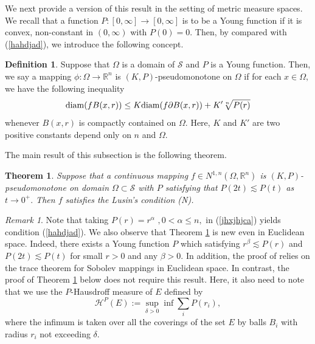 \documentclass[11pt,twoside]{article}
\newtheorem{thm}{Theorem}[section]
\theoremstyle{definition}
\newtheorem{defn}{Definition}[section]
\theoremstyle{remark}
\newtheorem*{rem}{Remark}
\newcommand{\aleq}{\lesssim}
\begin{document}
We next provide a version of this result in the setting of metric measure spaces. We recall that a function $P:[0,\infty]\rightarrow[0,\infty]$ is to be a Young function if it is convex, non-constant in $(0,\infty)$ with $P(0)=0.$ Then, by compared with (\ref{hahdjad}), we introduce the following concept.
\begin{defn}\label{019001sfgvbsdvfvg b}
 Suppose that $\Omega$ is a domain of $\mathcal{S}$ and $P$ is a Young function. Then, we say a mapping $\phi:\Omega\rightarrow \mathbb{R}^{n}$ is $(K,P)$-pseudomonotone on $\Omega$ if for each $x\in\Omega,$ we have the following inequality
\begin{equation}\label{jhxjhjca}
{\rm diam}(fB(x,r))\leq K{\rm diam}(f\partial B(x,r))+K'\sqrt[n]{P(r)}
\end{equation}
 whenever $B(x,r)$ is compactly contained on $\Omega.$ Here, $K$ and $K'$ are two positive constants depend only on $n$ and $\Omega.$
  \end{defn}
The main result of this subsection is the following theorem.
\begin{thm}\label{axkjlax}
  Suppose that a continuous mapping $f\in N^{1,n}(\Omega,\mathbb{R}^{n})$  is $(K,P)$-pseudomonotone on domain  $\Omega\subset\mathcal{S}$ with $P$ satisfying that $P(2t)\aleq P(t)$ as $t\rightarrow0^{+}.$ Then $f$ satisfies the Lusin's condition (N).
\end{thm}
\begin{rem}
Note that taking $P(r)=r^{\alpha}$ $,0<\alpha\leq n,$ in (\ref{jhxjhjca}) yields condition (\ref{hahdjad}). We also observe that Theorem \ref{axkjlax} is new even in Euclidean space. Indeed, there exists a Young function $P$ which satisfying $r^{\beta}\aleq P(r)$ and $P(2t)\aleq P(t)$ for small $r>0$ and any $\beta>0.$ In addition, the proof of \cite[Theorem 3.1]{Put03} relies on the trace theorem for Sobolev mappings in Euclidean space. In contrast, the proof of Theorem \ref{axkjlax} below does not require this result. Here, it also need to note that we use the $P$-Hausdroff measure of $E$ defined by
$$\mathcal{H}^{P}(E):=\sup_{\delta>0}\inf\sum_{i}P(r_{i}),$$
where the infimum is taken over all the coverings of the set $E$ by balls $B_{i}$ with radius $r_{i}$ not exceeding $\delta.$
\end{rem}
\end{document}
